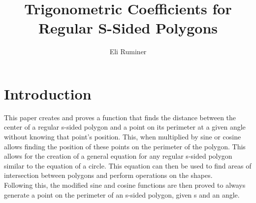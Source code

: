 \documentclass[11pt]{article}
\title{Trigonometric Coefficients for Regular S-Sided Polygons}
\author{Eli Ruminer}
\date{}
\begin{document}
\begin{titlepage}
\clearpage\maketitle
\thispagestyle{empty}
\end{titlepage}

\tableofcontents
\newpage

\section{Introduction}
This paper creates and proves a function that finds the distance between the center of a regular s-sided polygon and a point on its perimeter at a given angle without knowing that point's position. This, when multiplied by sine or cosine allows finding the position of these points on the perimeter of the polygon. This allows for the creation of a general equation for any regular s-sided polygon similar to the equation of a circle. This equation can then be used to find areas of intersection between polygons and perform operations on the shapes.\\
Following this, the modified sine and cosine functions are then proved to always generate a point on the perimeter of an s-sided polygon, given s and an angle.

\end{document}
